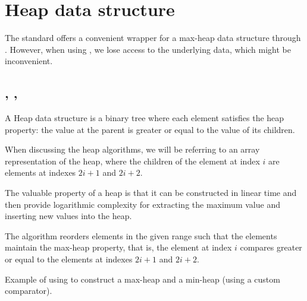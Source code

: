 \section{Heap data structure}

The standard offers a convenient wrapper for a max-heap data structure through .
However, when using , we lose access to the underlying data, which might be inconvenient.

\subsection{\texorpdfstring{, , }{\texttt{std::make\_heap}, \texttt{std::push\_heap}, \texttt{std::pop\_heap}}}

A Heap data structure is a binary tree where each element satisfies the heap property: the value at the parent is greater or equal to the value of its children.

When discussing the heap algorithms, we will be referring to an array representation of the heap, where the children of the element at index $i$ are elements at indexes $2i+1$ and $2i+2$.

The valuable property of a heap is that it can be constructed in linear time and then provide logarithmic complexity for extracting the maximum value and inserting new values into the heap.


The  algorithm reorders elements in the given range such that the elements maintain the max-heap property, that is, the element at index $i$ compares greater or equal to the elements at indexes $2i+1$ and $2i+2$.

\begin{box-note}
\footnotesize Example of using  to construct a max-heap and a min-heap (using a custom comparator).
\tcblower
{}
\end{box-note}

\subsection{\texorpdfstring{}{\texttt{std::sort\_heap}}}

